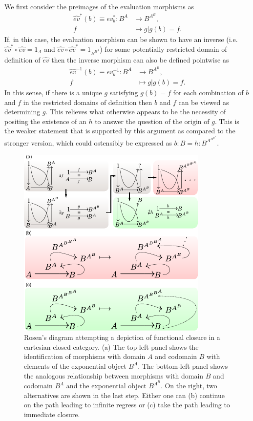 We first consider the preimages of the evaluation morphisms as
\begin{align*}
\hat{ev}^{*}(b) \equiv ev^{*}_b \colon B^A &\longrightarrow B^{A^B},\\
f &\longmapsto g |g(b)=f.
\end{align*}
If, in this case, the evaluation morphism can be shown to have an inverse (i.e. $\hat{ev}^{*} \circ \hat{ev} = 1_A$ and $\hat{ev} \circ \hat{ev}^{*}= 1_{B^{B^A}}$) for some potentially restricted domain of definition of $\hat{ev}$ then the inverse morphism can also be defined pointwise as 
\begin{align*}
\hat{ev}^{-1}(b) \equiv ev^{-1}_b \colon B^A &\longrightarrow B^{A^B},\\
f &\longmapsto g | g(b) = f.
\end{align*}
In this sense, if there is a unique $g$ satisfying $g(b)=f$ for each combination of $b$ and $f$ in the restricted domains of definition then $b$ and $f$ can be viewed as determining $g$. This relieves what otherwise appears to be the necessity of positing the existence of an $h$ to answer the question of the origin of $g$. This is the weaker statement that is supported by this argument as compared to the stronger version, which could ostensibly be expressed as $b:B = h:B^{A^{B^{B^A}}}$.

\begin{figure}
\begin{center}
\noindent\includegraphics[width=0.75\columnwidth]{fig/mrcatclosure.pdf}
\end{center}
\caption{Rosen's diagram attempting a depiction of functional closure in a cartesian closed category. (a) The top-left panel shows the identification of morphisms with domain $A$ and codomain $B$ with elements of the exponential object $B^A$. The bottom-left panel shows the analogous relationship between morphisms with domain $B$ and codomain $B^A$ and the exponential object $B^{A^B}$. On the right, two alternatives are shown in the last step. Either one can (b) continue on the path leading to infinite regress or (c) take the path leading to immediate closure.}
\label{fig:hom}
\end{figure}

